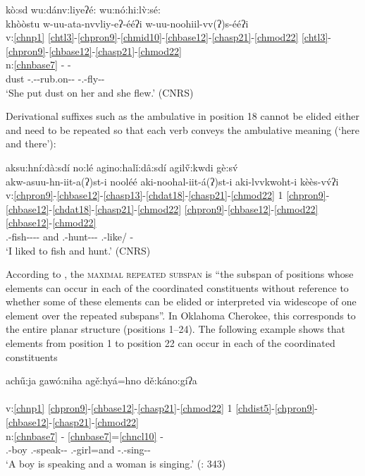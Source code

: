 \documentclass[output=paper]{langscibook}
\begin{document}
\ea\label{ex:cher:key:77} {kò:sd wu:dánv:liyeʔé: wu:nó:hi:l\`{v}:sé:} \\
\gllll khòòstu w-uu-ata-nvvliy-eʔ-ééʔi w-uu-noohiil-vv(ʔ)s-ééʔi\\
v:\ref{chnp1} \ref{chtl3}-\ref{chpron9}-\ref{chmid10}-\ref{chbase12}-\ref{chasp21}-\ref{chmod22} \ref{chtl3}-\ref{chpron9}-\ref{chbase12}-\ref{chasp21}-\ref{chmod22}\\
n:\ref{chnbase7} - -\\ 
dust \Trnsl{}-\Third\Sg.\Barg{}-\Refl{}-rub.on-\Prf{}-\Rep{} \Trnsl{}-\Third\Sg.\Barg{}-fly-\Prf{}-\Rep{}\\
\glt `She put dust on her and she flew.' (CNRS)
\z 

Derivational suffixes such as the ambulative in position 18 cannot be elided either and need to be repeated so that each verb conveys the ambulative meaning (`here and there'):

\ea\label{ex:cher:key:78} {aksu:hní:dà:sdí no:lé agino:halǐ:dâ:sdí agil\H{v}:kwdi gè:sv́} \\
\glll akw-asuu-hn-iit-a(ʔ)st-i nooléé aki-noohal-iit-á(ʔ)st-i aki-lvvkwoht-i kèès-vv́ʔi\\
v:\ref{chpron9}-\ref{chbase12}-\ref{chasp13}-\ref{chdat18}-\ref{chasp21}-\ref{chmod22} 1 \ref{chpron9}-\ref{chbase12}-\ref{chdat18}-\ref{chasp21}-\ref{chmod22} \ref{chpron9}-\ref{chbase12}-\ref{chmod22} \ref{chbase12}-\ref{chmod22}\\
\First\Sg.\Barg{}-fish-\Prf{}-\Amb{}-\Inf{}-\Nom{} and \First\Sg.\Barg{}-hunt-\Amb{}-\Inf{}-\Nom{} \First\Sg.\Barg{}-like/\Sh{} \Cop{}-\Asr{}\\
\glt `I liked to fish and hunt.' (CNRS)
\z 

According to \citet[30]{Tallman2020}, the \textsc{maximal} \textsc{repeated} \textsc{subspan} is “the subspan of positions whose elements can occur in each of the coordinated constituents without reference to whether some of these elements can be elided or interpreted via widescope of one element over the repeated subspans”. In Oklahoma Cherokee, this corresponds to the entire planar structure (positions 1--24). The following example shows that elements from position 1 to position 22 can occur in each of the coordinated constituents

\newpage
\ea\label{ex:cher:key:79} {ach\H{u}:ja gawó:niha agě:hyá=hno dě:káno:gíʔa} \\
\\
v:\ref{chnp1} \ref{chpron9}-\ref{chbase12}-\ref{chasp21}-\ref{chmod22} 1 \ref{chdist5}-\ref{chpron9}-\ref{chbase12}-\ref{chasp21}-\ref{chmod22}\\
n:\ref{chnbase7} - \ref{chnbase7}=\ref{chncl10} -\\ 
\Third\Sg.\Aarg{}-boy \Third\Sg.\Aarg{}-speak-\Prs{}-\Ind{} \Third\Sg.\Aarg{}-girl=and \Dist-\Third\Sg.\Aarg{}-sing-\Prs{}-\Ind{}\\
\glt `A boy is speaking and a woman is singing.' (\citealt{PulteFeeling1975}: 343)
\z 
\end{document}
